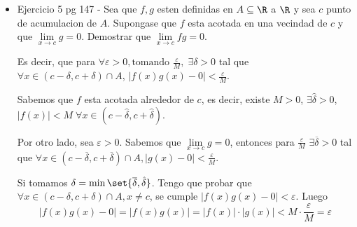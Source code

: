 \begin{example}
	\begin{itemize}
		\item Ejercicio 5 pg 147 - Sea que \(f,g \) esten definidas en \(A \subseteq \R \) a \(\R \) y sea \(c \) punto de acumulacion de \(A \). Supongase que \(f \) esta acotada en una vecindad de \(c \) y que \(\lim\limits_{x  \to c } g = 0 \). Demostrar que \(\lim\limits_{x  \to  c } fg = 0 \).

		      Es decir, que para \(\forall \varepsilon > 0, \text{tomando } \frac{\varepsilon}{M},  \;\exists \delta > 0\) tal que \(\forall x \in (c - \delta, c + \delta) \cap A \), \(\left\vert f(x)g(x) - 0  \right\vert < \frac{\varepsilon}{M}\).

		      Sabemos que \(f \) esta acotada alrededor de \(c \), es decir, existe \(M > 0 \), \(\exists \hat{\delta} > 0 \), \(\left\vert f(x ) \right\vert < M \; \forall x \in (c - \hat{\delta}, c + \hat{\delta })\).

		      Por otro lado, sea \(\varepsilon > 0 \). Sabemos que \(\lim\limits_{x  \to c } g = 0 \), entonces para \(\frac{\varepsilon}{M}\) \(\exists \overline{\delta} > 0 \) tal que \(\forall x \in (c - \overline{\delta}, c + \overline{\delta}) \cap A, \left\vert g(x) - 0  \right\vert < \frac{\varepsilon}{M}\).

		      Si tomamos \(\delta = \min\set{\overline{\delta}, \hat{\delta }}\). Tengo que probar que \(\forall x \in (c - \delta, c + \delta) \cap A, x \neq c \), se cumple \(\left\vert f(x) g(x) - 0  \right\vert < \varepsilon\). Luego
		      \[
			      \left\vert f(x)g(x) - 0  \right\vert = \left\vert f(x) g(x ) \right\vert  = \left\vert f(x ) \right\vert \cdot \left\vert g(x ) \right\vert < M \cdot \frac{\varepsilon}{M} = \varepsilon
		      \]



	\end{itemize}
\end{example}
